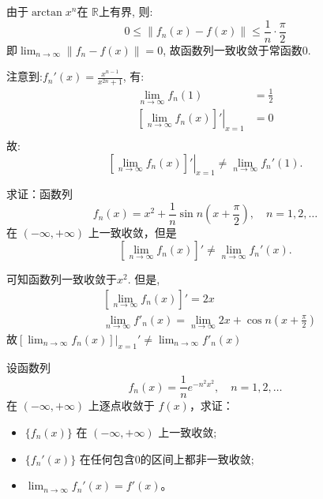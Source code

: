 \begin{solution}
    由于\(\arctan x^{n}\)在 \(\mathbb{R}\)上有界, 则:
    \[
        0 \le  \left\lVert f_{n}(x) - f(x) \right\rVert \le
        \frac{1}{n} \cdot \frac{\pi}{2}
    \]
    即\(\lim_{n \to \infty} \left\lVert f_{n} - f(x) \right\rVert =
    0\), 故函数列一致收敛于常函数\(0\).

    注意到:\(f_{n}'(x) = \frac{x^{n - 1}}{x^{2n} + 1}\), 有:
    \begin{align*}
        \lim_{n \to \infty} f_{n}(1) & = \frac{1}{2} \\
        \left. \left[ \lim_{n \to \infty} f_{n}(x) \right]'
        \right|_{x=1}                & = 0           \\
    \end{align*}
    故: \[
        \left. \left[ \lim_{n \to \infty} f_n(x) \right]'
        \right|_{x = 1}
        \neq \lim_{n \to \infty} f_n'(1).
    \]
\end{solution}

\begin{problem}
    求证：函数列
    \[
        f_n(x) = x^2 + \frac{1}{n} \sin n \left( x + \frac{\pi}{2}
        \right), \quad n = 1, 2, \dots
    \]
    在 \((-\infty, +\infty)\) 上一致收敛，但是
    \[
        \left[ \lim_{n \to \infty} f_n(x) \right]' \neq \lim_{n \to
        \infty} f_n'(x).
    \]
\end{problem}

\begin{solution}
    可知函数列一致收敛于\(x^{2}\).
    但是,
    \begin{align*}
        & \left[ \lim_{n \to \infty} f_{n}(x) \right]' = 2x        \\
        & \lim_{n \to \infty} f'_{n}(x) = \lim_{n \to \infty} 2x +
        \cos n \left( x + \frac{\pi}{2} \right)
    \end{align*}
    故\(\left.\left[ \lim_{n \to \infty} f_n(x) \right]\right|_{x=1}'
        \neq \lim_{n \to
    \infty} f'_{n}(x)\)
\end{solution}

\begin{problem}
    设函数列
    \[
        f_n(x) = \frac{1}{n} e^{-n^2 x^2}, \quad n = 1, 2, \dots
    \]
    在 \((-\infty, +\infty)\) 上逐点收敛于 \(f(x)\)，求证：
    \begin{itemize}
        \item \(\{f_n(x)\}\) 在 \((-\infty, +\infty)\) 上一致收敛;
        \item \(\{f_n'(x)\}\) 在任何包含0的区间上都非一致收敛;
        \item \(\lim_{n \to \infty} f_n'(x) = f'(x)\)。
    \end{itemize}
\end{problem}

